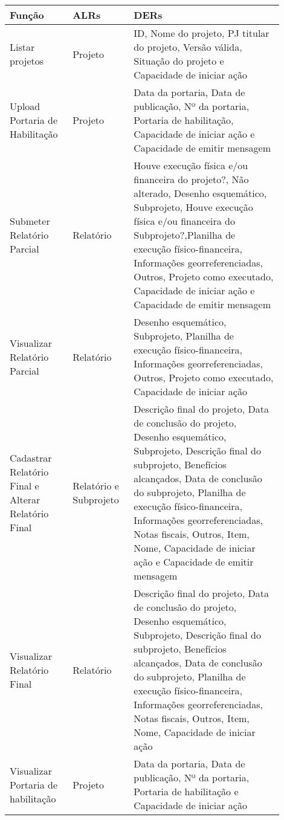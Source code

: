 	\vfill
	\pagebreak
	\label{der_alr_info}
	\begin{longtable}{p{0.20\linewidth}p{0.20\linewidth}p{0.50\linewidth}}
	  \hline
	  \textbf{Função} & \textbf{ALRs} & \textbf{DERs} \\
	  \hline
	    Listar projetos&	Projeto&	ID, Nome do projeto, PJ titular do projeto, Versão válida, Situação do projeto e Capacidade de iniciar ação\\

	    \hline
	    Upload Portaria de Habilitação&	    Projeto &	Data da portaria, Data de publicação, Nº da portaria, Portaria de habilitação, Capacidade de iniciar ação e Capacidade de emitir mensagem \\

	    \hline
	    Submeter Relatório Parcial&	Relatório&	Houve execução física e/ou financeira do projeto?, Não alterado, Desenho esquemático, Subprojeto, Houve execução física e/ou financeira do
	    Subprojeto?,Planilha de execução físico-financeira, Informações georreferenciadas, Outros, Projeto como executado, Capacidade de iniciar ação e Capacidade de emitir mensagem\\
	    \hline
	    Visualizar Relatório Parcial&	Relatório&	Desenho esquemático, Subprojeto, Planilha de execução físico-financeira, Informações georreferenciadas, Outros, Projeto como executado, Capacidade de 
	    iniciar ação\\
	    \hline
	    Cadastrar Relatório Final e Alterar Relatório Final&	Relatório e Subprojeto&	Descrição final do projeto, Data de conclusão do projeto, Desenho esquemático, Subprojeto, Descrição final do subprojeto, Benefícios alcançados,
	    Data de conclusão do subprojeto, Planilha de execução físico-financeira, Informações georreferenciadas, Notas fiscais, Outros, Item, Nome, Capacidade de iniciar ação e Capacidade de emitir mensagem\\

	    \hline
	    Visualizar Relatório Final & Relatório& Descrição final do projeto, Data de conclusão do projeto, Desenho esquemático, Subprojeto, Descrição final do subprojeto, Benefícios alcançados, Data de 
	    conclusão do subprojeto, Planilha de execução físico-financeira, Informações georreferenciadas, Notas fiscais, Outros, Item, Nome, Capacidade de iniciar ação \\
	    \hline
	    Visualizar Portaria de habilitação&	 Projeto & Data da portaria, Data de publicação, Nº da portaria, Portaria de habilitação e Capacidade de iniciar ação\\


\end{longtable}
